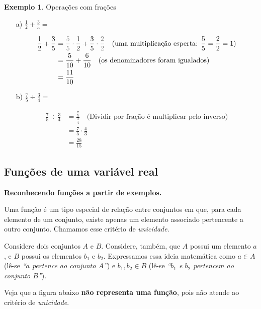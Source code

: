 \documentclass[12pt,openright,twoside,a4paper]{article}
\theoremstyle{definition}
\newtheorem{example}{Exemplo}[section]
\begin{document}
	\begin{example}Operações com frações
		\begin{itemize}
			\item[a)] $\displaystyle\frac{1}{2} + \frac{3}{5} =$
			
			\begin{align*}
				\frac{1}{2} + \frac{3}{5} &= {\textcolor{gray}{\frac{5}{5}}}\cdot\frac{1}{2} + \frac{3}{5} \cdot {\textcolor{gray}{\frac{2}{2}}} \quad \text{(uma multiplicação esperta: $\frac{5}{5} = \frac{2}{2} = 1$)}\\
				&= \frac{5}{10} + \frac{6}{10} \quad \text{(os denominadores foram igualados)}\\
				&= \frac{11}{10}
			\end{align*}
			
			\item[b)] $\displaystyle\frac{7}{5} \div \frac{3}{4} =$
			
			\begin{align*}
				\frac{7}{5} \div \frac{3}{4} &= \frac{\frac{7}{5}}{\frac{3}{4}} \quad \text{(Dividir por fração é multiplicar pelo inverso)}\\
				&= \frac{7}{5} \cdot \frac{4}{3}\\
				&= \frac{28}{15}
			\end{align*}
		\end{itemize}
	\end{example}
	
	\subsection{Funções de uma variável real}
	
	\textbf{Reconhecendo funções a partir de exemplos.}
	
	Uma função é um tipo especial de relação entre conjuntos em que, para cada elemento de um conjunto, existe apenas um elemento associado pertencente a outro conjunto. Chamamos esse critério de \textit{unicidade}.
	
	Considere dois conjuntos $A$ e $B$. Considere, também, que $A$ possui um elemento $a$, e $B$ possui os elementos $b_1$ e $b_2$. Expressamos essa ideia matemática como $a \in A$ (lê-se \textit{``$a$ pertence ao conjunto $A$''}) e $b_1, b_2 \in B$ (lê-se \textit{``$b_1$ e $b_2$ pertencem ao conjunto $B$''}). 
	
	Veja que a figura abaixo \textbf{não representa uma função}, pois não atende ao critério de \textit{unicidade}.
	
\end{document}

